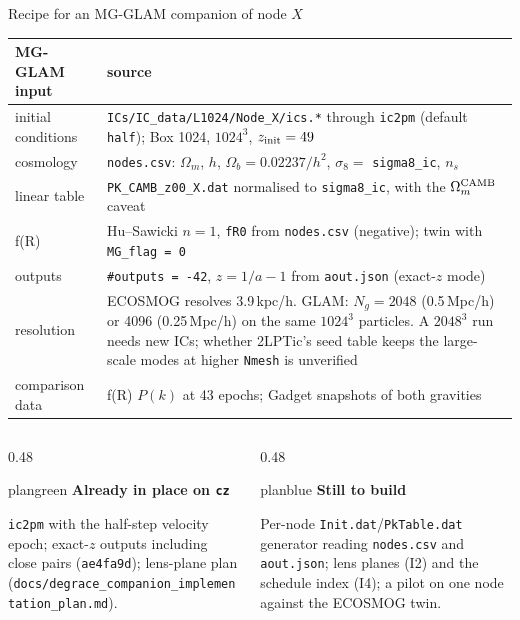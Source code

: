 \documentclass[UTF8]{beamer}
\begin{document}
\begin{frame}{Recipe for an MG-GLAM companion of node $X$}
  \scriptsize
  \setlength{\tabcolsep}{4pt}
  \begin{tabular}{@{}lp{}@{}}
    \toprule
    MG-GLAM input & source \\
    \midrule
    initial conditions & \texttt{ICs/IC\_data/L1024/Node\_X/ics.*} through \texttt{ic2pm} (default \texttt{half}); Box 1024, $1024^3$, $z_{\rm init} = 49$ \\
    cosmology & \texttt{nodes.csv}: $\Omega_m$, $h$, $\Omega_b = 0.02237/h^2$, $\sigma_8 =$ \texttt{sigma8\_ic}, $n_s$ \\
    linear table & \texttt{PK\_CAMB\_z00\_X.dat} normalised to \texttt{sigma8\_ic}, with the $\Omega_m^{\rm CAMB}$ caveat \\
    f(R) & Hu--Sawicki $n = 1$, \texttt{fR0} from \texttt{nodes.csv} (negative); twin with \texttt{MG\_flag = 0} \\
    outputs & \texttt{\#outputs = -42}, $z = 1/a - 1$ from \texttt{aout.json} (exact-$z$ mode) \\
    resolution & ECOSMOG resolves 3.9\,kpc/h. GLAM: $N_g = 2048$ (0.5\,Mpc/h) or 4096 (0.25\,Mpc/h) on the same $1024^3$ particles.
                 A $2048^3$ run needs new ICs; whether 2LPTic's seed table keeps the large-scale modes at higher \texttt{Nmesh} is unverified \\
    comparison data & f(R) $P(k)$ at 43 epochs; Gadget snapshots of both gravities \\
    \bottomrule
  \end{tabular}

  \vspace{1ex}
  \begin{columns}[T,totalwidth=\textwidth]
    \begin{column}{0.48\textwidth}
      \begin{phasebox}[colback=plangreen!6]{plangreen}
        {\color{plangreen}\bfseries Already in place on \texttt{cz}}\par\smallskip
        \scriptsize
        \texttt{ic2pm} with the half-step velocity epoch; exact-$z$ outputs including close pairs (\texttt{ae4fa9d});
        lens-plane plan (\texttt{docs/degrace\_companion\_implementation\_plan.md}).
      \end{phasebox}
    \end{column}
    \hfill
    \begin{column}{0.48\textwidth}
      \begin{phasebox}{planblue}
        {\color{planblue}\bfseries Still to build}\par\smallskip
        \scriptsize
        Per-node \texttt{Init.dat}/\texttt{PkTable.dat} generator reading \texttt{nodes.csv} and \texttt{aout.json};
        lens planes (I2) and the schedule index (I4); a pilot on one node against the ECOSMOG twin.
      \end{phasebox}
    \end{column}
  \end{columns}
\end{frame}
\end{document}
